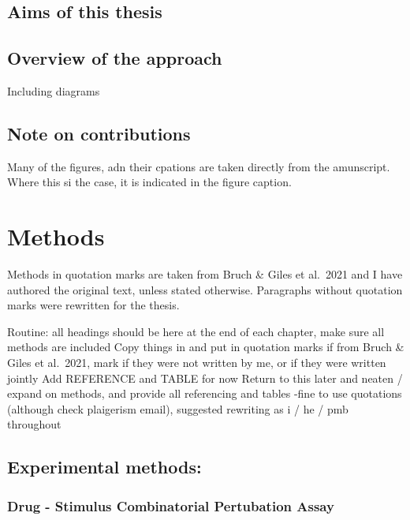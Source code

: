 \documentclass[11pt, a4paper, twosided]{book}
\begin{document}
\hypertarget{aims-of-this-thesis}{%
\section{Aims of this thesis}\label{aims-of-this-thesis}}

\hypertarget{overview-of-the-approach}{%
\section{Overview of the approach}\label{overview-of-the-approach}}

Including diagrams

\hypertarget{note-on-contributions}{%
\section{Note on contributions}\label{note-on-contributions}}

Many of the figures, adn their cpations are taken directly from the amunscript. Where this si the case, it is indicated in the figure caption.

\hypertarget{methods}{%
\chapter{Methods}\label{methods}}

Methods in quotation marks are taken from Bruch \& Giles et al.~2021 and I have authored the original text, unless stated otherwise. Paragraphs without quotation marks were rewritten for the thesis.

Routine:
all headings should be here
at the end of each chapter, make sure all methods are included
Copy things in and put in quotation marks if from Bruch \& Giles et al.~2021, mark if they were not written by me, or if they were written jointly
Add REFERENCE and TABLE for now
Return to this later and neaten / expand on methods, and provide all referencing and tables
-fine to use quotations (although check plaigerism email), suggested rewriting as i / he / pmb throughout

\hypertarget{experimental-methods}{%
\section{Experimental methods:}\label{experimental-methods}}

\hypertarget{drug---stimulus-combinatorial-pertubation-assay}{%
\subsection{Drug - Stimulus Combinatorial Pertubation Assay}\label{drug---stimulus-combinatorial-pertubation-assay}}
\end{document}
